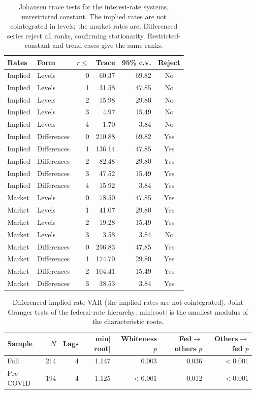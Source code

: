 \begin{table}[htbp]
\centering
\setlength{\belowcaptionskip}{8pt}
\small

\caption{Johansen trace tests for the interest-rate systems, unrestricted constant. The implied rates are not cointegrated in levels; the market rates are. Differenced series reject all ranks, confirming stationarity. Restricted-constant and trend cases give the same ranks.}
\label{tab:johansen}
\begin{tabular}{llrrrc}
\toprule
Rates & Form & $r\le$ & Trace & 95\% c.v. & Reject \\
\midrule
Implied & Levels & 0 & 60.37 & 69.82 & No \\
Implied & Levels & 1 & 31.58 & 47.85 & No \\
Implied & Levels & 2 & 15.98 & 29.80 & No \\
Implied & Levels & 3 & 4.97 & 15.49 & No \\
Implied & Levels & 4 & 1.70 & 3.84 & No \\
Implied & Differences & 0 & 210.88 & 69.82 & Yes \\
Implied & Differences & 1 & 136.14 & 47.85 & Yes \\
Implied & Differences & 2 & 82.48 & 29.80 & Yes \\
Implied & Differences & 3 & 47.52 & 15.49 & Yes \\
Implied & Differences & 4 & 15.92 & 3.84 & Yes \\
Market & Levels & 0 & 78.50 & 47.85 & Yes \\
Market & Levels & 1 & 41.07 & 29.80 & Yes \\
Market & Levels & 2 & 19.28 & 15.49 & Yes \\
Market & Levels & 3 & 3.58 & 3.84 & No \\
Market & Differences & 0 & 296.83 & 47.85 & Yes \\
Market & Differences & 1 & 174.70 & 29.80 & Yes \\
Market & Differences & 2 & 104.41 & 15.49 & Yes \\
Market & Differences & 3 & 38.53 & 3.84 & Yes \\
\bottomrule
\end{tabular}
\end{table}

\begin{table}[htbp]
\centering
\setlength{\belowcaptionskip}{8pt}
\small

\caption{Differenced implied-rate VAR (the implied rates are not cointegrated). Joint Granger tests of the federal-rate hierarchy; min$|$root$|$ is the smallest modulus of the characteristic roots.}
\label{tab:ratehier_implied}
\begin{tabular}{lrrrrrr}
\toprule
Sample & $N$ & Lags & min$|$root$|$ & Whiteness $p$ & Fed$\to$others $p$ & Others$\to$fed $p$ \\
\midrule
Full & 214 & 4 & 1.147 & 0.003 & 0.036 & $<$0.001 \\
Pre-COVID & 194 & 4 & 1.125 & $<$0.001 & 0.012 & $<$0.001 \\
\bottomrule
\end{tabular}
\end{table}

